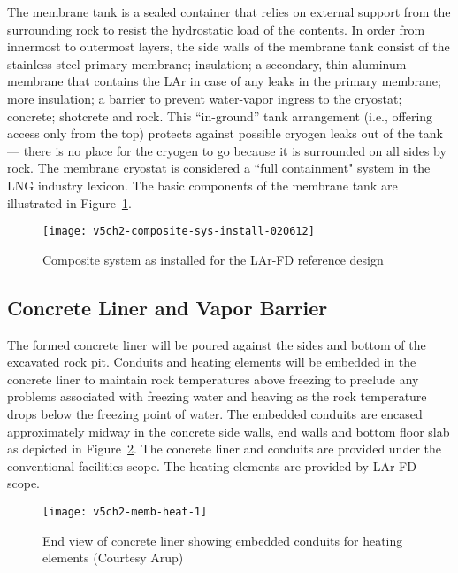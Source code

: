 The membrane tank is a sealed container that relies on external support from the surrounding rock to resist the hydrostatic load of the contents. In order from innermost to outermost layers, the side walls of the membrane tank consist of the stainless-steel primary membrane; insulation; a secondary, thin aluminum 
membrane that contains the LAr in case of any leaks in the primary membrane; more insulation; a barrier to prevent water-vapor ingress to the cryostat; concrete; shotcrete and rock.  This ``in-ground'' tank arrangement (i.e., offering access only from the top) protects against possible cryogen leaks out of the tank --- there is no place for the cryogen to go because it is surrounded on all sides by rock. The membrane cryostat is considered a ``full containment" system in the LNG industry lexicon. The basic components of the membrane tank are illustrated in Figure~\ref{fig:composite-sys-install}.



\begin{figure}[htbp]
\centering
\texttt{[image: v5ch2-composite-sys-install-020612]}
\caption{Composite system as installed for the LAr-FD reference design} 
\label{fig:composite-sys-install}
\end{figure}



\subsection{Concrete Liner and Vapor Barrier}
The formed concrete liner will be poured against the sides and bottom of the excavated rock pit. Conduits and heating elements will be embedded in the concrete liner to maintain rock temperatures above freezing to preclude any problems associated with freezing water and heaving as the rock temperature drops below the freezing point of water.  The embedded conduits are encased approximately midway in the concrete side walls, end walls and bottom floor slab as depicted in Figure~\ref{fig:endview-liner}.  The concrete liner and conduits are provided under the conventional facilities scope.  The heating elements are provided by LAr-FD scope.

\begin{figure}[htbp]
\centering
\texttt{[image: v5ch2-memb-heat-1]}
\caption[End view of concrete liner showing embedded conduits for heating elements]{End view of concrete liner showing embedded conduits for heating elements (Courtesy Arup)}
\label{fig:endview-liner}
\end{figure}

